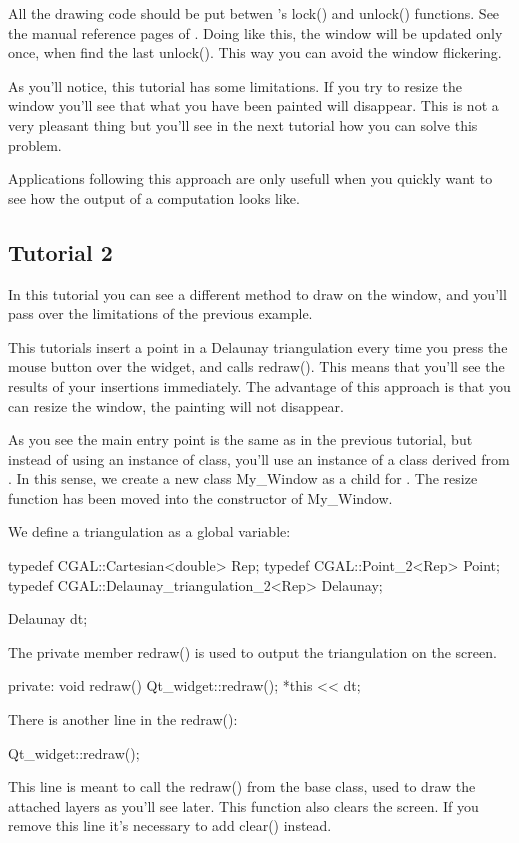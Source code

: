 All the drawing code should be put betwen 's lock() and
unlock() functions. See the manual reference pages of
. Doing like this, the window will be updated only
once, when  find the last unlock(). This way you can avoid the window flickering.

As you'll notice, this tutorial has some limitations. If you try to
resize the window you'll see that what you have been painted will
disappear. This is not a very pleasant thing but you'll see in the
next tutorial how you can solve this problem.

Applications following this approach are only usefull when you quickly
want to see how the output of a computation looks like.

\subsection*{Tutorial 2}

In this tutorial you can see a different method to draw on the window,
and you'll pass over the limitations of the previous example.

This tutorials insert a point in a Delaunay triangulation every time
you press the mouse button over the widget, and calls redraw(). This
means that you'll see the results of your insertions immediately. The
advantage of this approach is that you can resize the window, the
painting will not disappear.

As you see the main entry point is the same as in the previous
tutorial, but instead of using an instance of 
class, you'll use an instance of a class derived from .
In this sense, we create a new class My\_Window as a child for
. The resize function has been moved into the
constructor of My\_Window.

We define a triangulation as a global variable:
\begin{ccExampleCode}
typedef CGAL::Cartesian<double>             Rep;
typedef CGAL::Point_2<Rep>                  Point;
typedef CGAL::Delaunay_triangulation_2<Rep> Delaunay;

Delaunay dt;
\end{ccExampleCode}
The private member redraw() is used to output the triangulation on the screen. 
\begin{ccExampleCode}
private:
  void redraw()
  {
    Qt_widget::redraw();
    *this << dt;
  }
\end{ccExampleCode}
There is another line in the redraw():
\begin{ccExampleCode}
Qt_widget::redraw();
\end{ccExampleCode}
This line is meant to call the redraw() from the 
base class, used to draw the attached layers as you'll see later. This function
also clears the screen. If you remove this line it's necessary to add
clear() instead.

